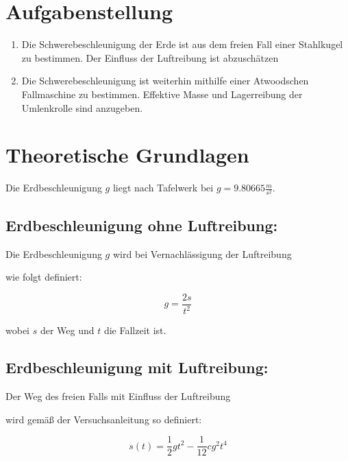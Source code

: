 \documentclass{protokoll}
\begin{document}
\section{Aufgabenstellung}


\begin{enumerate}

\item Die Schwerebeschleunigung der Erde ist aus dem freien Fall 
einer Stahlkugel zu bestimmen. Der Einfluss der Luftreibung 
ist abzuschätzen
\item Die Schwerebeschleunigung ist weiterhin mithilfe einer Atwoodschen 
Fallmaschine zu bestimmen. Effektive Masse und Lagerreibung der 
Umlenkrolle sind anzugeben.

\end{enumerate}


\section{Theoretische Grundlagen}

Die Erdbeschleunigung $g$ liegt nach Tafelwerk bei $g = 9.80665 \frac{m}{s^2}$.




\subsection{Erdbeschleunigung ohne Luftreibung:}

Die Erdbeschleunigung $g$ wird bei Vernachlässigung der Luftreibung 

wie folgt definiert:


\begin{equation}
 g = \frac{2s}{t^2} 
\end{equation}




wobei $s$ der Weg und $t$ die Fallzeit ist.




\subsection{Erdbeschleunigung mit Luftreibung:}

Der Weg des freien Falls mit Einfluss der Luftreibung 

wird gemäß der Versuchsanleitung so definiert:


\begin{equation}
 s(t) = \frac{1}{2} g t^2 - \frac{1}{12} c g^2 t^4 
\end{equation}
\end{document}
